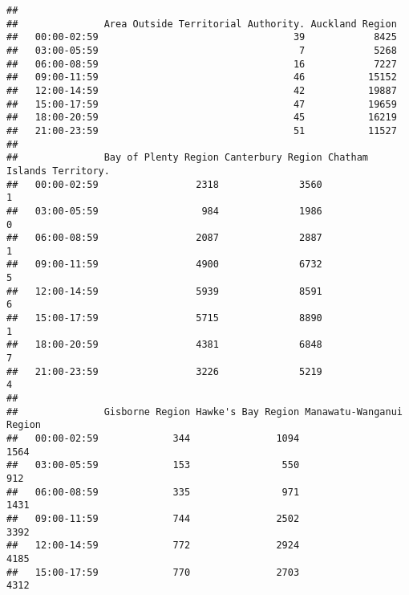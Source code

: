 \documentclass[
  10pt,
]{article}
\newenvironment{Shaded}{\begin{snugshade}}{\end{snugshade}}
\newcommand{\CommentTok}[1]{\textcolor[rgb]{0.56,0.35,0.01}{\textit{#1}}}
\newcommand{\FunctionTok}[1]{\textcolor[rgb]{0.00,0.00,0.00}{#1}}
\newcommand{\NormalTok}[1]{#1}
\newcommand{\OtherTok}[1]{\textcolor[rgb]{0.56,0.35,0.01}{#1}}
\newcommand{\SpecialCharTok}[1]{\textcolor[rgb]{0.00,0.00,0.00}{#1}}
\begin{document}
\begin{Shaded}
\end{Shaded}

\begin{verbatim}
##              
##               Area Outside Territorial Authority. Auckland Region
##   00:00-02:59                                  39            8425
##   03:00-05:59                                   7            5268
##   06:00-08:59                                  16            7227
##   09:00-11:59                                  46           15152
##   12:00-14:59                                  42           19887
##   15:00-17:59                                  47           19659
##   18:00-20:59                                  45           16219
##   21:00-23:59                                  51           11527
##              
##               Bay of Plenty Region Canterbury Region Chatham Islands Territory.
##   00:00-02:59                 2318              3560                          1
##   03:00-05:59                  984              1986                          0
##   06:00-08:59                 2087              2887                          1
##   09:00-11:59                 4900              6732                          5
##   12:00-14:59                 5939              8591                          6
##   15:00-17:59                 5715              8890                          1
##   18:00-20:59                 4381              6848                          7
##   21:00-23:59                 3226              5219                          4
##              
##               Gisborne Region Hawke's Bay Region Manawatu-Wanganui Region
##   00:00-02:59             344               1094                     1564
##   03:00-05:59             153                550                      912
##   06:00-08:59             335                971                     1431
##   09:00-11:59             744               2502                     3392
##   12:00-14:59             772               2924                     4185
##   15:00-17:59             770               2703                     4312

\end{verbatim}
\end{document}
